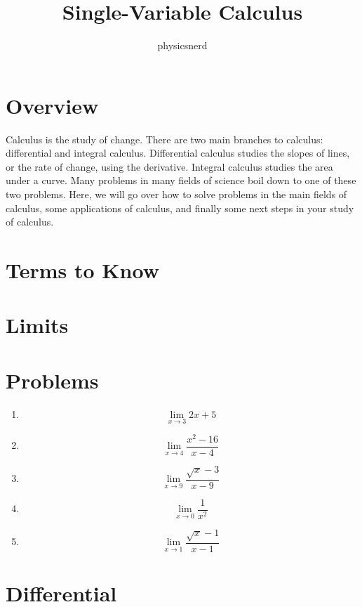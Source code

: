 \documentclass[12pt]{article}
\title{Single-Variable Calculus}
\author{physicsnerd}
\begin{document}
\maketitle
\tableofcontents

\section{Overview}
Calculus is the study of change. 
There are two main branches to calculus: differential and integral calculus. 
Differential calculus studies the slopes of lines, or the rate of change, using the derivative. 
Integral calculus studies the area under a curve. 
Many problems in many fields of science boil down to one of these two problems. 
Here, we will go over how to solve problems in the main fields of calculus, some applications of calculus, and finally some next steps in your study of calculus.

\section{Terms to Know}



\section{Limits}



\section{Problems}
\begin{enumerate}
    \item $$\lim\limits_{x\rightarrow 3} 2x+5$$
    \item $$\lim\limits_{x\rightarrow 4} \frac{x^2-16}{x-4}$$
    \item $$\lim\limits_{x\rightarrow 9} \frac{\sqrt{x}-3}{x-9}$$
    \item $$\lim\limits_{x\rightarrow 0} \frac{1}{x^2}$$
    \item $$\lim\limits_{x\rightarrow 1} \frac{\sqrt{x}-1}{x-1}$$
\end{enumerate}

\section{Differential}


\end{document}
